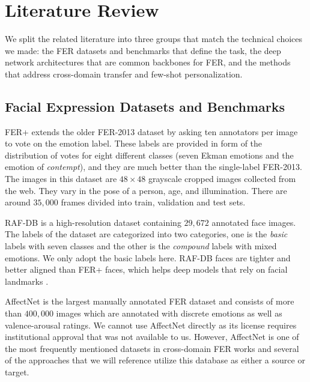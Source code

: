 \documentclass[12pt,a4paper]{article}
\begin{document}
\section{Literature Review}
\label{sec:litrev}

We split the related literature into three groups that match
the technical choices we made: the FER datasets and benchmarks
that define the task, the deep network architectures that are
common backbones for FER, and the methods that address
cross-domain transfer and few-shot personalization.

\subsection{Facial Expression Datasets and Benchmarks}
\label{sec:litrev:datasets}

FER+ \autocite{barsoum2016ferplus} extends the older FER-2013
dataset by asking ten annotators per image to vote on the
emotion label.  These labels are provided in form of the distribution of votes
for eight different classes (seven Ekman emotions and the emotion of
\emph{contempt}), and they are much better than the single-label FER-2013. The images in
this dataset are $48\times 48$ grayscale cropped images collected from the web. They vary
in the pose of a person, age, and illumination. There are around $35{,}000$ frames
divided into train, validation and test sets.

RAF-DB \autocite{li2019rafdb} is a high-resolution dataset
containing $29{,}672$ annotated face images.
The labels of the dataset are categorized into two categories,
one is the \emph{basic} labels with seven classes
and the other is the \emph{compound} labels with mixed emotions.
We only adopt the basic labels here.  RAF-DB
faces are tighter and better aligned than FER+ faces, which
helps deep models that rely on facial landmarks
\autocite{wang2020ran}.

AffectNet \autocite{mollahosseini2017affectnet} is the largest manually
annotated FER dataset and consists of more than $400{,}000$ images which
are annotated with discrete emotions as well as valence-arousal
ratings. We cannot use AffectNet directly as its license
requires institutional approval that was not available to us.
However, AffectNet is one of the most frequently mentioned datasets
in cross-domain FER works and several of the approaches that we will
reference utilize this database as either a source or target.
\end{document}
